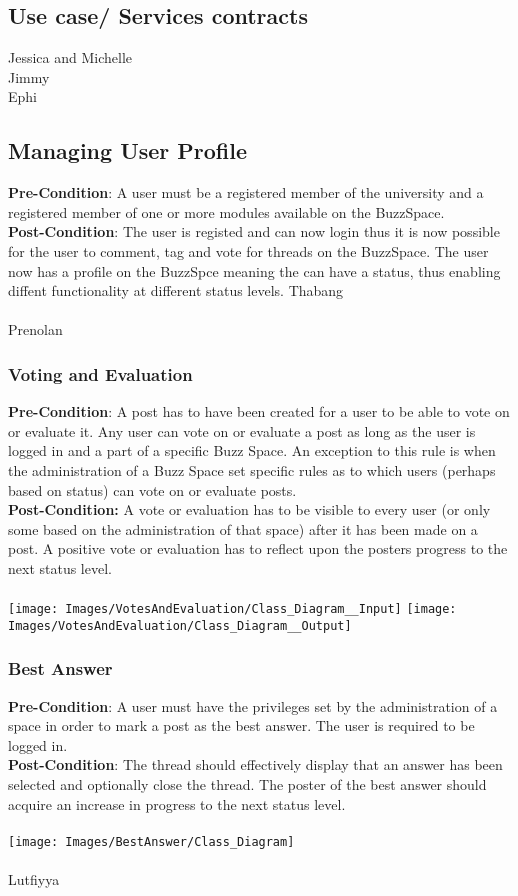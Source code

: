\documentclass[a4paper,11pt]{article}
\begin{document}
\subsection{Use case/ Services contracts}
Jessica and Michelle\\
Jimmy\\
Ephi\\
\subsection{Managing User Profile}
\textbf{Pre-Condition}: A user must be a registered member of the university and a registered member of one or more modules available on the BuzzSpace.
\\
\textbf{Post-Condition}: The user is registed and can now login thus it is now possible for the user to comment, tag and vote for threads on the BuzzSpace. The user now has a profile on the BuzzSpce meaning the can have a status, thus enabling diffent functionality at different status levels.
Thabang\\
\\
Prenolan
\subsubsection{Voting and Evaluation}
\textbf{Pre-Condition}: A post has to have been created for a user to be able to vote on or evaluate it. Any user can vote on or evaluate a post as long as the user is logged in and a part of a specific Buzz Space. An exception to this rule is when the administration of a Buzz Space set specific rules as to which users (perhaps based on status) can vote on or evaluate posts.
\\
\textbf{Post-Condition:} A vote or evaluation has to be visible to every user (or only some based on the administration of that space) after it has been made on a post. A positive vote or evaluation has to reflect upon the posters progress to the next status level.
\\
\\
\texttt{[image: Images/VotesAndEvaluation/Class\_Diagram\_\_Input]}
\texttt{[image: Images/VotesAndEvaluation/Class\_Diagram\_\_Output]}
\\
\subsubsection{Best Answer}
\textbf{Pre-Condition}: A user must have the privileges set by the administration of a space in order to mark a post as the best answer. The user is required to be logged in.
\\
\textbf{Post-Condition}: The thread should effectively display that an answer has been selected and optionally close the thread. The poster of the best answer should acquire an increase in progress to the next status level.
\\
\\
\texttt{[image: Images/BestAnswer/Class\_Diagram]}
\\
\\
Lutfiyya\\
\end{document}
